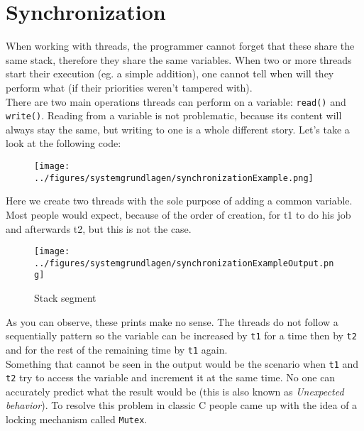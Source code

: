 \section{Synchronization}
When working with threads, the programmer cannot forget that these share the same stack, therefore they share the same variables. When two or more threads start their execution (eg. a simple addition), one cannot tell when will they perform what (if their priorities weren't tampered with).\\
There are two main operations threads can perform on a variable: \texttt{read()} and \texttt{write()}. Reading from a variable is not problematic, because its content will always stay the same, but writing to one is a whole different story. Let's take a look at the following code:
\begin{figure}[!htb]
	\centering
	\texttt{[image: ../figures/systemgrundlagen/synchronizationExample.png]}
\end{figure}
Here we create two threads with the sole purpose of adding a common variable. Most people would expect, because of the order of creation, for t1 to do his job and afterwards t2, but this is not the case.
\newpage
\begin{wrapfigure}{1}{0.5\textwidth}
	\centering
	\texttt{[image: ../figures/systemgrundlagen/synchronizationExampleOutput.png]}
	\caption{Stack segment}
\end{wrapfigure}

As you can observe, these prints make no sense. The threads do not follow a sequentially pattern so the variable can be increased by \texttt{t1} for a time then by \texttt{t2} and for the rest of the remaining time by \texttt{t1} again.\\
Something that cannot be seen in the output would be the scenario when \texttt{t1} and \texttt{t2} try to access the variable and increment it at the same time. No one can accurately predict what the result would be (this is also known as \textit{ Unexpected behavior}). To resolve this problem in classic C people came up with the idea of a locking mechanism called \texttt{Mutex}.\\
